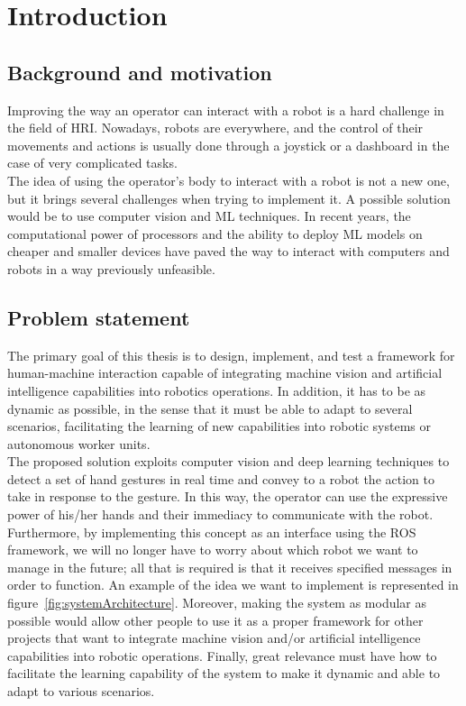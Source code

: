 \documentclass[../thesis.tex]{subfiles}
\begin{document}
\chapter{Introduction}\label{cap:introduction}

\section{Background and motivation}
Improving the way an operator can interact with a robot is a hard challenge in the field of \gls{HRI}. Nowadays, robots are everywhere, and the control of their movements and actions is usually done through a joystick or a dashboard in the case of very complicated tasks.\\
The idea of using the operator's body to interact with a robot is not a new one, but it brings several challenges when trying to implement it. A possible solution would be to use computer vision and \gls{ML} techniques. In recent years, the computational power of processors and the ability to deploy \gls{ML} models on cheaper and smaller devices have paved the way to interact with computers and robots in a way previously unfeasible.

\section{Problem statement}
The primary goal of this thesis is to design, implement, and test a framework for human-machine interaction capable of integrating machine vision and artificial intelligence capabilities into robotics operations. In addition, it has to be as dynamic as possible, in the sense that it must be able to adapt to several scenarios, facilitating the learning of new capabilities into robotic systems or autonomous worker units.\\

The proposed solution exploits computer vision and deep learning techniques to detect a set of hand gestures in real time and convey to a robot the action to take in response to the gesture. In this way, the operator can use the expressive power of his/her hands and their immediacy to communicate with the robot. Furthermore, by implementing this concept as an interface using the \gls{ROS} framework, we will no longer have to worry about which robot we want to manage in the future; all that is required is that it receives specified messages in order to function. An example of the idea we want to implement is represented in figure~\ref{fig:systemArchitecture}. Moreover, making the system as modular as possible would allow other people to use it as a proper framework for other projects that want to integrate machine vision and/or artificial intelligence capabilities into robotic operations. Finally, great relevance must have how to facilitate the learning capability of the system to make it dynamic and able to adapt to various scenarios.
\end{document}
